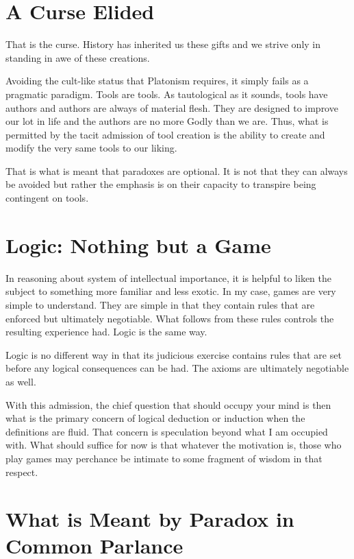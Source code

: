 \documentclass{article}
\begin{document}
	\section{A Curse Elided}
	
	That is the curse. History has inherited us these gifts and we strive only in standing in awe of these creations.
	
	Avoiding the cult-like status that Platonism requires, it simply fails as a pragmatic paradigm. Tools are tools. As tautological as it sounds, tools have authors and authors are always of material flesh. They are designed to improve our lot in life and the authors are no more Godly than we are. Thus, what is permitted by the tacit admission of tool creation is the ability to create and modify the very same tools to our liking.
	
	That is what is meant that paradoxes are optional. It is not that they can always be avoided but rather the emphasis is on their capacity to transpire being contingent on tools.
	
	\section{Logic: Nothing but a Game}
	
	In reasoning about system of intellectual importance, it is helpful to liken the subject to something more familiar and less exotic. In my case, games are very simple to understand. They are simple in that they contain rules that are enforced but ultimately negotiable. What follows from these rules controls the resulting experience had. Logic is the same way.
	
	Logic is no different way in that its judicious exercise contains rules that are set before any logical consequences can be had. The axioms are ultimately negotiable as well.
	
	With this admission, the chief question that should occupy your mind is then what is the primary concern of logical deduction or induction when the definitions are fluid. That concern is speculation beyond what I am occupied with. What should suffice for now is that whatever the motivation is, those who play games may perchance be intimate to some fragment of wisdom in that respect.
	
	\section{What is Meant by Paradox in Common Parlance}
	
\end{document}
